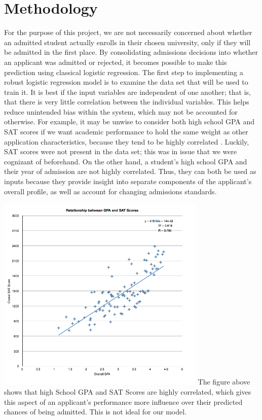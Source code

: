 \documentclass{article}
\begin{document}
\section{Methodology}
For the purpose of this project, we are not necessarily concerned about whether an admitted student actually enrolls in their chosen university, only if they will be admitted in the first place. By consolidating admissions decisions into whether an applicant was admitted or rejected, it becomes possible to make this prediction using classical logistic regression. \newline
The first step to implementing a robust logistic regression model is to examine the data set that will be used to train it.
It is best if the input variables are independent of one another; that is, that there is very little correlation between the individual variables. This helps reduce unintended bias within the system, which  may not be accounted for otherwise. For example, it may be unwise to consider both high school GPA and SAT scores if we want academic performance to hold the same weight as other application characteristics, because they tend to be highly correlated \cite{Zarate}. Luckily, SAT scores were not present in the data set; this was in issue that we were cognizant of beforehand. On the other hand, a student's high school GPA and their year of admission are not highly correlated. Thus, they can both be used as inputs because they provide insight into separate components of the applicant's overall profile, as well as account for changing admissions standards. \newline
\begin{center}
  \includegraphics[width=100mm, scale=0.5]{images/SATvsGPA.png} \newline
  The figure above shows that high School GPA and SAT Scores are highly correlated, which gives this aspect of an applicant's performance more influence over their predicted chances of being admitted. This is not ideal for our model.
\end{center}
\end{document}
